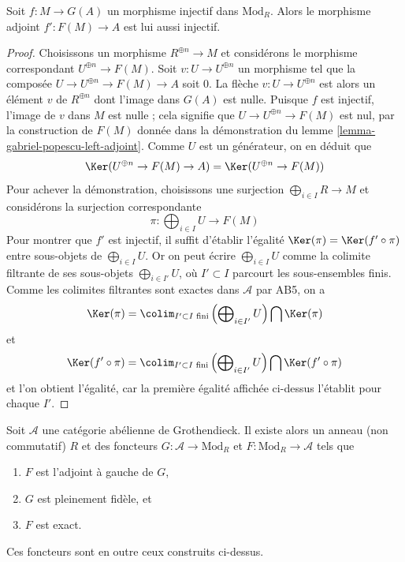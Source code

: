 \begin{lemma}
\label{lemma-F-G-monos}
Soit $f : M \to G(A)$ un morphisme injectif dans $\text{Mod}_R$.
Alors le morphisme adjoint $f' : F(M) \to A$ est lui aussi injectif.
\end{lemma}

\begin{proof}
Choisissons un morphisme $R^{\oplus n} \to M$ et considérons le morphisme
correspondant $U^{\oplus n} \to F(M)$. Soit
$v : U \to U^{\oplus n}$ un morphisme tel que la composée
$U \to U^{\oplus n} \to F(M) \to A$ soit $0$. La flèche
$v : U \to U^{\oplus n}$ est alors un élément $v$ de $R^{\oplus n}$ dont
l'image dans $G(A)$ est nulle. Puisque $f$ est injectif, l'image de $v$ dans
$M$ est nulle ; cela signifie que $U \to U^{\oplus n} \to F(M)$ est nul,
par la construction de $F(M)$ donnée dans la démonstration du
lemme \ref{lemma-gabriel-popescu-left-adjoint}. Comme $U$ est un générateur, on en
déduit que
$$
\Ker(U^{\oplus n} \to F(M) \to A) = \Ker(U^{\oplus n} \to F(M))
$$
Pour achever la démonstration, choisissons une surjection
$\bigoplus_{i \in I} R \to M$ et considérons la surjection correspondante
$$
\pi : \bigoplus\nolimits_{i \in I} U \longrightarrow F(M)
$$
Pour montrer que $f'$ est injectif, il suffit d'établir l'égalité
$\Ker(\pi) = \Ker(f' \circ \pi)$ entre sous-objets de
$\bigoplus_{i \in I} U$. Or on peut écrire $\bigoplus_{i \in I} U$ comme la
colimite filtrante de ses sous-objets $\bigoplus_{i \in I'} U$, où
$I' \subset I$ parcourt les sous-ensembles finis. Comme les colimites
filtrantes sont exactes dans $\mathcal{A}$ par AB5, on a
$$
\Ker(\pi) =
\colim_{I' \subset I\text{ fini}}
\left(\bigoplus\nolimits_{i \in I'} U\right)
\bigcap \Ker(\pi)
$$
et
$$
\Ker(f' \circ \pi) =
\colim_{I' \subset I\text{ fini}}
\left(\bigoplus\nolimits_{i \in I'} U\right)
\bigcap \Ker(f' \circ \pi)
$$
et l'on obtient l'égalité, car la première égalité affichée ci-dessus
l'établit pour chaque $I'$.
\end{proof}

\begin{theorem}
\label{theorem-gabriel-popescu}
Soit $\mathcal{A}$ une catégorie abélienne de Grothendieck. Il existe alors
un anneau (non commutatif) $R$ et des foncteurs
$G : \mathcal{A} \to \text{Mod}_R$ et
$F : \text{Mod}_R \to \mathcal{A}$ tels que
\begin{enumerate}
\item $F$ est l'adjoint à gauche de $G$,
\item $G$ est pleinement fidèle, et
\item $F$ est exact.
\end{enumerate}
Ces foncteurs sont en outre ceux construits ci-dessus.
\end{theorem}

